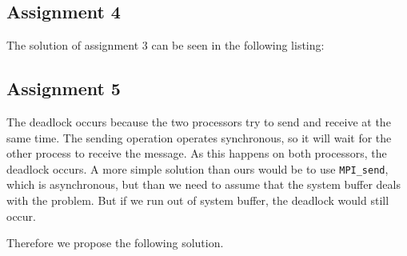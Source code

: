 	\subsection{Assignment 4}
		
		The solution of assignment 3 can be seen in the following listing:
		


	\subsection{Assignment 5}
		The deadlock occurs because the two processors try to send and receive at the same time.
		The sending operation operates synchronous,
		so it will wait for the other process to receive the message.
		As this happens on both processors,
		the deadlock occurs.
		A more simple solution than ours would be to use \texttt{MPI\_send},
		which is asynchronous,
		but than we need to assume that the system buffer deals with the problem.
		But if we run out of system buffer,
		the deadlock would still occur.
		
		Therefore we propose the following solution.
		

